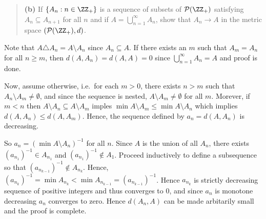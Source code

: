 \documentclass{homework}
\begin{document}
\begin{quote}
  {\bf (b)} If $\{A_n:n\in \ZZ_+\}$ is a sequence of subsets of $\mathcal P(\ZZ_+)$ 
  satisfying $A_n\subseteq A_{n+1}$ for all $n$ and if
  $A=\bigcup_{n=1}^\infty A_n$, show that $A_n\to A$ in the metric space
  $(\mathcal P(\ZZ_+),d)$.
\end{quote}
\begin{solution}
  Note that $A\triangle A_n = A \setminus A_n$ since $A_n\subseteq A$.  
  If there exists an $m$ such that $A_m = A_n$ for all $n \ge m$, then
  $d(A,A_n) = d(A,A) = 0$ since $\bigcup_{n=1}^\infty A_n = A$ and proof is done.  

  Now, assume otherwise, i.e.~for each $m>0$, there exists $n>m$ such that
  $A_n\setminus A_m \not= \emptyset$, and since the sequence is nested,
  $A\setminus A_m \not= \emptyset$ for all $m$.   Morever, if $m<n$ then $A\setminus A_n
  \subseteq A\setminus A_m$ imples $\min A\setminus A_m \le \min A\setminus
  A_n$ which implies $d(A,A_n) \le d(A,A_m)$.  Hence, the sequence defined by
  $a_n = d(A,A_n)$ is decreasing.
     
    So $a_n = (\min A\setminus A_n)^{-1}$ for all $n$.  Since $A$ is the union of all $A_n$, there exists $(a_{n_1})^{-1} \in A_{n_1}$ and $(a_{n_1})^{-1} \not\in A_1$.  Proceed inductively to define a subsequence so that $(a_{n_{k-1}})^{-1} \not\in A_{n_k}$. Hence, $(a_{n_k})^{-1} = \min A_{n_k} < \min A_{n_{k-1}} = (a_{n_{k-1}})^{-1}$.  Hence $a_{n_k}$ is strictly decreasing sequence of positive integers and thus converges to $0$, and since $a_n$ is monotone decreasing $a_n$ converges to zero.  Hence $d(A_n,A)$ can be made arbitarily small and the proof is complete.
    \end{solution}
\end{document}
